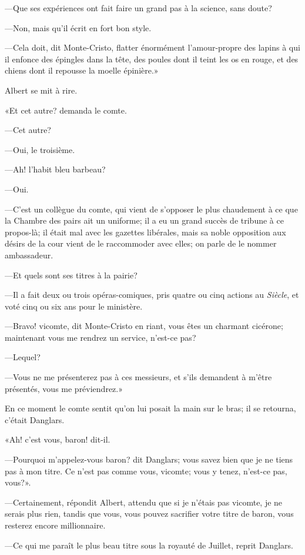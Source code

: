 —Que ses expériences ont fait faire un grand pas à la science, sans doute? 

—Non, mais qu'il écrit en fort bon style. 

—Cela doit, dit Monte-Cristo, flatter énormément l'amour-propre des lapins à qui il enfonce des épingles dans la tête, des poules dont il teint les os en rouge, et des chiens dont il repousse la moelle épinière.»  

Albert se mit à rire. 

«Et cet autre? demanda le comte. 

—Cet autre? 

—Oui, le troisième. 

—Ah! l'habit bleu barbeau? 

—Oui. 

—C'est un collègue du comte, qui vient de s'opposer le plus chaudement à ce que la Chambre des pairs ait un uniforme; il a eu un grand succès de tribune à ce propos-là; il était mal avec les gazettes libérales, mais sa noble opposition aux désirs de la cour vient de le raccommoder avec elles; on parle de le nommer ambassadeur. 

—Et quels sont ses titres à la pairie? 

—Il a fait deux ou trois opéras-comiques, pris quatre ou cinq actions au \textit{Siècle}, et voté cinq ou six ans pour le ministère. 

—Bravo! vicomte, dit Monte-Cristo en riant, vous êtes un charmant cicérone; maintenant vous me rendrez un service, n'est-ce pas? 

—Lequel? 

—Vous ne me présenterez pas à ces messieurs, et s'ils demandent à m'être présentés, vous me préviendrez.» 

En ce moment le comte sentit qu'on lui posait la main sur le bras; il se retourna, c'était Danglars. 

«Ah! c'est vous, baron! dit-il. 

—Pourquoi m'appelez-vous baron? dit Danglars; vous savez bien que je ne tiens pas à mon titre. Ce n'est pas comme vous, vicomte; vous y tenez, n'est-ce pas, vous?». 

—Certainement, répondit Albert, attendu que si je n'étais pas vicomte, je ne serais plus rien, tandis que vous, vous pouvez sacrifier votre titre de baron, vous resterez encore millionnaire. 

—Ce qui me paraît le plus beau titre sous la royauté de Juillet, reprit Danglars. 

